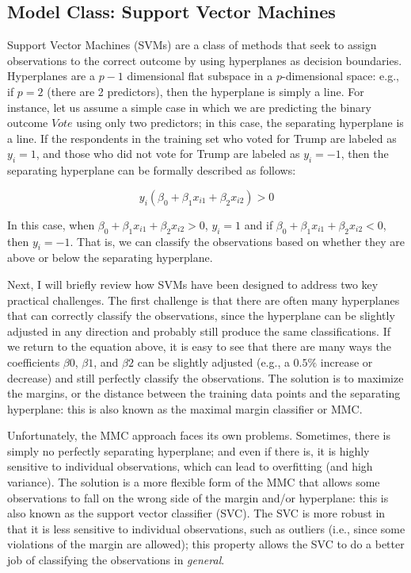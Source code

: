 \documentclass{book}
\begin{document}
\hypertarget{model-class-support-vector-machines}{%
\subsection{Model Class: Support Vector
Machines}\label{model-class-support-vector-machines}}

Support Vector Machines (SVMs) are a class of methods that seek to assign
observations to the correct outcome by using hyperplanes as decision
boundaries. Hyperplanes are a \(p-1\) dimensional flat subspace in a
\(p\)-dimensional space: e.g., if \(p = 2\) (there are 2 predictors), then the
hyperplane is simply a line. For instance, let us assume a simple case in
which we are predicting the binary outcome \(Vote\) using only two predictors;
in this case, the separating hyperplane is a line. If the respondents in the
training set who voted for Trump are labeled as \(y_{i}=1\), and those who did
not vote for Trump are labeled as \(y_{i}=-1\), then the separating hyperplane
can be formally described as follows:

\[y_{i} \left(  \beta _{0}+ \beta _{1}x_{i1}+ \beta _{2}x_{i2} \right) >0\]

In this case, when \(\beta _{0}+ \beta _{1}x_{i1}+ \beta _{2}x_{i2}>0\),
\(y_{i}=1\) and if \(\beta _{0}+ \beta _{1}x_{i1}+ \beta _{2}x_{i2}<0\), then
\(y_{i}=-1\). That is, we can classify the observations based on whether they
are above or below the separating hyperplane.

Next, I will briefly review how SVMs have been designed to address two key
practical challenges. The first challenge is that there are often many
hyperplanes that can correctly classify the observations, since the hyperplane
can be slightly adjusted in any direction and probably still produce the same
classifications. If we return to the equation above, it is easy to see that
there are many ways the coefficients \(\beta {0}\), \(\beta {1}\), and
\(\beta {2}\) can be slightly adjusted (e.g., a \(0.5\%\) increase or
decrease) and still perfectly classify the observations. The solution is to
maximize the margins, or the distance between the training data points and the
separating hyperplane: this is also known as the maximal margin classifier or
MMC.

Unfortunately, the MMC approach faces its own problems. Sometimes, there is
simply no perfectly separating hyperplane; and even if there is, it is highly
sensitive to individual observations, which can lead to overfitting (and high
variance). The solution is a more flexible form of the MMC that allows some
observations to fall on the wrong side of the margin and/or hyperplane: this
is also known as the support vector classifier (SVC). The SVC is more robust
in that it is less sensitive to individual observations, such as outliers
(i.e., since some violations of the margin are allowed); this property allows
the SVC to do a better job of classifying the observations in \emph{general}.
\end{document}
